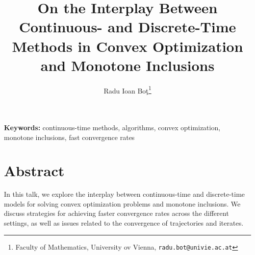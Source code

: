 \documentclass[11pt]{article}
\title{\bfseries On the Interplay Between Continuous- and Discrete-Time Methods in Convex Optimization and Monotone Inclusions}
\author{
Radu Ioan Bo\c t\thanks{Faculty of Mathematics, University ov Vienna,
\texttt{radu.bot@univie.ac.at}}
}
\date{}
\begin{document}
\maketitle

\vspace{-1em}

\noindent
\textbf{Keywords:}
continuous-time methods,  algorithms,  convex optimization,  monotone inclusions,  fast convergence rates

\vspace{0.5em}


\vspace{1em}

\section*{Abstract}

In this talk,  we explore the interplay between continuous-time and discrete-time models for solving convex optimization problems and monotone inclusions.   We discuss strategies for achieving faster convergence rates across the different settings, as well as issues related to the convergence of trajectories and iterates.

\end{document}
